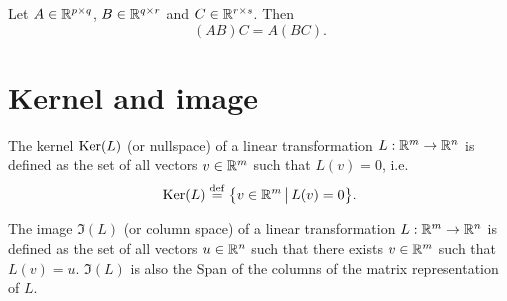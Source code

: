 \documentclass[11pt,nocut]{article}
\begin{document}

\begin{proposition}
	Let $A \in \mathbb{R}^{p \times q}$, $B \in \mathbb{R}^{q \times r}$ and $C \in \mathbb{R}^{r \times s}$. Then
	$$
	(AB) C = A (BC).
	$$
\end{proposition}



\section{Kernel and image}

\begin{definition}[Kernel]
	The kernel ${{\rm Ker}}(L)$ (or nullspace) of a linear transformation $L: \mathbb{R}^m \to \mathbb{R}^n$ is defined as the set of all vectors $v \in \mathbb{R}^m$ such that $L(v) = 0$, i.e.
	$$
	{{\rm Ker}}(L) \overset{\rm def}{=} \big\{ v \in \mathbb{R}^m \, \big| \, L(v) = 0 \big\}.
	$$
\end{definition}

\begin{definition}[Image]
	The image $\Im(L)$ (or column space) of a linear transformation $L: \mathbb{R}^m \to \mathbb{R}^n$ is defined as the set of all vectors $u \in \mathbb{R}^n$ such that there exists $v \in \mathbb{R}^m$ such that $L(v) = u$. 
	$\Im(L)$ is also the Span of the columns of the matrix representation of $L$.
\end{definition}
\end{document}
